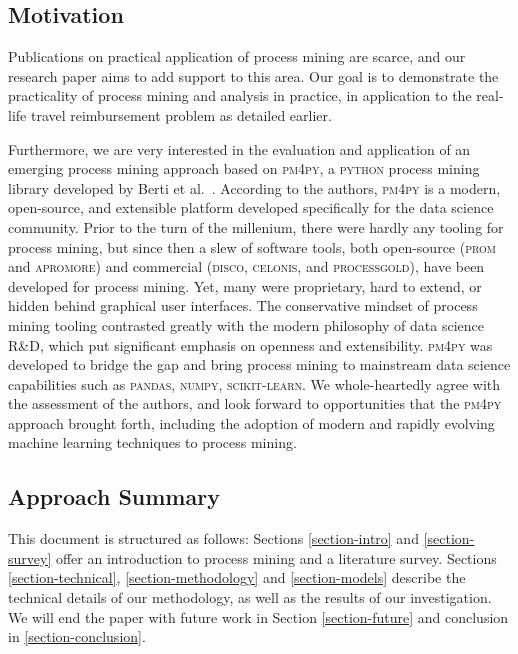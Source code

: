\documentclass[conference]{IEEEtran}
\begin{document}
\subsection{Motivation}

Publications on practical application of process mining are scarce,
and our research paper aims to add support to this area. Our goal is
to demonstrate the practicality of process mining and analysis
in practice, in application to the real-life travel reimbursement problem
as detailed earlier.

Furthermore, we are very interested in the evaluation and application
of an emerging process mining approach based on
\textsc{pm4py}, a \textsc{python} process mining library
developed by Berti et al.~\cite{BeZe2019}.
According to the authors,
\textsc{pm4py} is a modern, open-source, and extensible platform developed
specifically for the data science community. Prior to the turn of the
millenium,
there were hardly any tooling for process mining, but
since then a slew of software tools, both open-source
(\textsc{prom} and \textsc{apromore}) and commercial
(\textsc{disco}, \textsc{celonis}, and \textsc{processgold}),
have been developed for process mining.
Yet, many were proprietary, hard to extend,
or hidden behind graphical user interfaces.
The conservative mindset of process mining
tooling contrasted greatly with the modern philosophy of data science
R\&D,
which put significant emphasis on openness and extensibility.
\textsc{pm4py} was developed to bridge the gap
and bring process mining to mainstream data science
capabilities such as
\textsc{pandas}, \textsc{numpy}, \textsc{scikit-learn}.
We whole-heartedly
agree with the assessment of the authors, and look forward to opportunities
that the \textsc{pm4py} approach brought forth, including
the adoption of modern and rapidly evolving machine learning
techniques to process mining.


\subsection{Approach Summary}

This document is structured as follows: Sections \ref{section-intro} and
\ref{section-survey}
offer an introduction to process mining and a literature survey.
Sections \ref{section-technical}, \ref{section-methodology} and
\ref{section-models} describe the technical details of our methodology, as
well as the results of our investigation. We will end the paper with
future work in Section \ref{section-future} and conclusion in
\ref{section-conclusion}.
\end{document}
